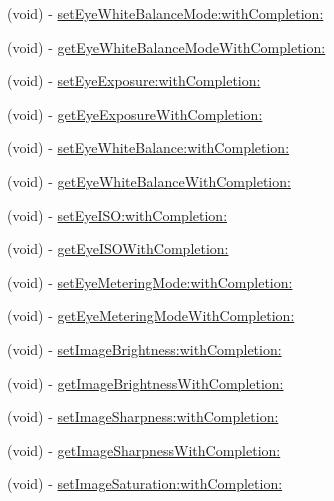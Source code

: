 \begin{DoxyCompactItemize}
\item 
(void) -\/ \hyperlink{interface_p_v_camera_aaea924d3c945f1cac7fe8bdc4433fff1}{set\+Eye\+White\+Balance\+Mode\+:with\+Completion\+:}
\item 
(void) -\/ \hyperlink{interface_p_v_camera_a7246fd0017db39695dbed1493e14d8af}{get\+Eye\+White\+Balance\+Mode\+With\+Completion\+:}
\item 
(void) -\/ \hyperlink{interface_p_v_camera_a5c1088dd07d5a5e59a72b3975ac2eca0}{set\+Eye\+Exposure\+:with\+Completion\+:}
\item 
(void) -\/ \hyperlink{interface_p_v_camera_adf3aa9a65b5f86442e1319b8e57384ca}{get\+Eye\+Exposure\+With\+Completion\+:}
\item 
(void) -\/ \hyperlink{interface_p_v_camera_a961ca08ddc7a825839fbbe7c8ec6b2f8}{set\+Eye\+White\+Balance\+:with\+Completion\+:}
\item 
(void) -\/ \hyperlink{interface_p_v_camera_a6dbe18974bb0369fd79c24ddd46f73e4}{get\+Eye\+White\+Balance\+With\+Completion\+:}
\item 
(void) -\/ \hyperlink{interface_p_v_camera_af16aafd83e9375c1441e0063688369fe}{set\+Eye\+I\+S\+O\+:with\+Completion\+:}
\item 
(void) -\/ \hyperlink{interface_p_v_camera_a6e8b62164f4f0f27cedc6515143bb0e8}{get\+Eye\+I\+S\+O\+With\+Completion\+:}
\item 
(void) -\/ \hyperlink{interface_p_v_camera_ada976a84eb9c6b7e567e2ea213642d1f}{set\+Eye\+Metering\+Mode\+:with\+Completion\+:}
\item 
(void) -\/ \hyperlink{interface_p_v_camera_ae5a1c30bcc202c74c934564298caa229}{get\+Eye\+Metering\+Mode\+With\+Completion\+:}
\item 
(void) -\/ \hyperlink{interface_p_v_camera_a3da42da7c06e424a411c3055b8d1ff26}{set\+Image\+Brightness\+:with\+Completion\+:}
\item 
(void) -\/ \hyperlink{interface_p_v_camera_af38ef1f2833bf09a8f0e2d87dad820c9}{get\+Image\+Brightness\+With\+Completion\+:}
\item 
(void) -\/ \hyperlink{interface_p_v_camera_a89432430f4c187806f1efc35f19f95ea}{set\+Image\+Sharpness\+:with\+Completion\+:}
\item 
(void) -\/ \hyperlink{interface_p_v_camera_a8356a196f4c15b712f23b36a712b5e21}{get\+Image\+Sharpness\+With\+Completion\+:}
\item 
(void) -\/ \hyperlink{interface_p_v_camera_aa47631050d6132dd5b635af91aeede86}{set\+Image\+Saturation\+:with\+Completion\+:}
\item 

\end{DoxyCompactItemize}
